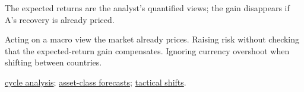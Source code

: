 \begin{qfexample}
 The expected returns are the analyst's quantified views; the gain disappears if A's recovery is already priced.

 Acting on a macro view the market already prices. Raising risk without checking that the expected-return gain compensates. Ignoring currency overshoot when shifting between countries.

 \hyperref[meth:cycle-policy-curve-expectations]{cycle analysis}; \hyperref[meth:asset-class-return-forecasts]{asset-class forecasts}; \hyperref[meth:tactical-shifts-behavioural-biases]{tactical shifts}.

\end{qfexample}
